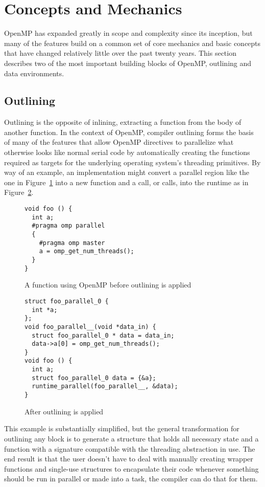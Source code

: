 \section{Concepts and Mechanics}
\label{sec:concepts}

OpenMP has expanded greatly in scope and complexity since its inception, but
many of the features build on a common set of core mechanics and basic concepts
that have changed relatively little over the past twenty years.  This section
describes two of the most important building blocks of OpenMP, outlining and
data environments.

\subsection{Outlining}
\label{sub:outlining}

Outlining is the opposite of inlining, extracting a function from the body
of another function.  In the context of OpenMP, compiler outlining forms the
basis of many of the features that allow OpenMP directives to parallelize what
otherwise looks like normal serial code by automatically creating the functions
required as targets for the underlying operating system's threading primitives.
By way of an example, an implementation might convert a parallel region like
the one in Figure~\ref{fig:outline-before} into a new function and a call, or
calls, into the runtime as in Figure~\ref{fig:outline-after}.

\begin{figure}
\begin{verbatim}
void foo () {
  int a;
  #pragma omp parallel
  {
    #pragma omp master
    a = omp_get_num_threads();
  }
}
\end{verbatim}
\caption{A function using OpenMP before outlining is applied}
\label{fig:outline-before}
\end{figure}

\begin{figure}
\begin{verbatim}
struct foo_parallel_0 {
  int *a;
};
void foo_parallel__(void *data_in) {
  struct foo_parallel_0 * data = data_in;
  data->a[0] = omp_get_num_threads();
}
void foo () {
  int a;
  struct foo_parallel_0 data = {&a};
  runtime_parallel(foo_parallel__, &data);
}
\end{verbatim}
\caption{After outlining is applied}
\label{fig:outline-after}
\end{figure}

This example is substantially simplified, but the general transformation for
outlining any block is to generate a structure that holds all necessary state
and a function with a signature compatible with the threading abstraction in
use.  The end result is that the user doesn't have to deal with manually
creating wrapper functions and single-use structures to encapsulate their code
whenever something should be run in parallel or made into a task, the compiler
can do that for them.

